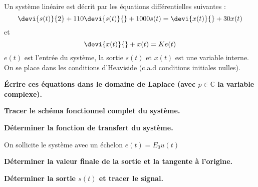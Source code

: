 
Un système linéaire est décrit par les équations différentielles suivantes :
\[
\devi{s(t)}{2} + 110 \devi{s(t)}{} + 1000 s(t) = \devi{x(t)}{} + 30 x(t)
\]
et 
\[
\devi{x(t)}{} + x(t) = K e(t) 
\]
$e(t)$ est l'entrée du système, la sortie $s(t)$ et $x(t)$ est une variable
interne. On se place dans les conditions d'Heaviside (c.a.d conditions 
initiales nulles).\newline

\question{}
\textbf{\'Ecrire ces équations dans le domaine de Laplace (avec 
$p\in\mathbb{C}$ la variable complexe).}

\question{}
\textbf{Tracer le schéma fonctionnel complet du système.}

\question{}
\textbf{Déterminer la fonction de transfert du système.}
\newline

On sollicite le système avec un échelon $e(t)=E_0 u(t)$

\question{}
\textbf{Déterminer la valeur finale de la sortie et la tangente à l'origine.}

\question{}
\textbf{Déterminer la sortie $s(t)$ et tracer le signal.}


